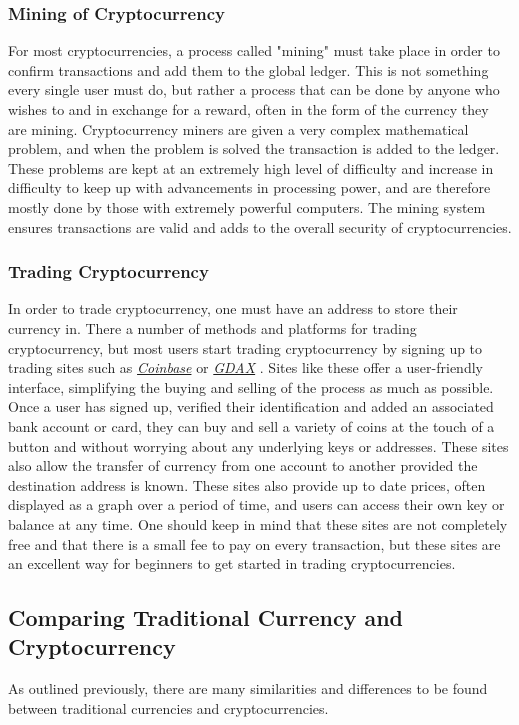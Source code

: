 \subsubsection{Mining of Cryptocurrency}\label{mining}
For most cryptocurrencies, a process called "mining" must take place in order to confirm transactions and add them to the global ledger. This is not something every single user must do, but rather a process that can be done by anyone who wishes to and in exchange for a reward, often in the form of the currency they are mining. Cryptocurrency miners are given a very complex mathematical problem, and when the problem is solved the transaction is added to the ledger. These problems are kept at an extremely high level of difficulty and increase in difficulty to keep up with advancements in processing power, and are therefore mostly done by those with extremely powerful computers. The mining system ensures transactions are valid and adds to the overall security of cryptocurrencies.

\subsubsection{Trading Cryptocurrency}\label{tradingcrypto}
In order to trade cryptocurrency, one must have an address to store their currency in. There a number of methods and platforms for trading cryptocurrency, but most users start trading cryptocurrency by signing up to trading sites such as \textcolor{NavyBlue}{\href{https://www.coinbase.com/}{\textit{Coinbase}}} \cite{coinbase} or \textcolor{NavyBlue}{\href{https://www.gdax.com/}{\textit{GDAX}}} \cite{gdax}. Sites like these offer a user-friendly interface, simplifying the buying and selling of the process as much as possible. Once a user has signed up, verified their identification and added an associated bank account or card, they can buy and sell a variety of coins at the touch of a button and without worrying about any underlying keys or addresses. These sites also allow the transfer of currency from one account to another provided the destination address is known. These sites also provide up to date prices, often displayed as a graph over a period of time, and users can access their own key or balance at any time. One should keep in mind that these sites are not completely free and that there is a small fee to pay on every transaction, but these sites are an excellent way for beginners to get started in trading cryptocurrencies.

\subsection{Comparing Traditional Currency and Cryptocurrency}\label{sssectradvscrypto}
As outlined previously, there are many similarities and differences to be found between traditional currencies and cryptocurrencies.

